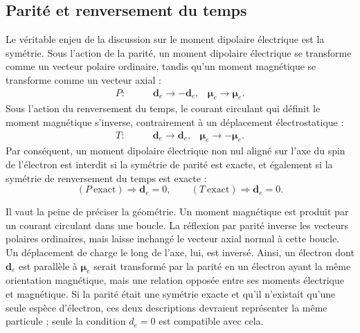 \begin{classroomqa}\end{classroomqa}

\subsection{Parité et renversement du temps}

Le véritable enjeu de la discussion sur le moment dipolaire électrique est la symétrie. Sous l’action de la parité, un moment dipolaire électrique se transforme comme un vecteur polaire ordinaire, tandis qu’un moment magnétique se transforme comme un vecteur axial : \begin{align}
P:\qquad &\mathbf d_e \to -\mathbf d_e,
&\boldsymbol{\mu}_e \to \boldsymbol{\mu}_e .
\end{align}Sous l’action du renversement du temps, le courant circulant qui définit le moment magnétique s’inverse, contrairement à un déplacement électrostatique : \begin{align}
T:\qquad &\mathbf d_e \to \mathbf d_e,
&\boldsymbol{\mu}_e \to -\boldsymbol{\mu}_e .
\end{align}Par conséquent, un moment dipolaire électrique non nul aligné sur l’axe du spin de l’électron est interdit si la symétrie de parité est exacte, et également si la symétrie de renversement du temps est exacte : \begin{equation}
(P\ \text{exact}) \Rightarrow \mathbf d_e=0,
\qquad
(T\ \text{exact}) \Rightarrow \mathbf d_e=0.
\end{equation}

Il vaut la peine de préciser la géométrie. Un moment magnétique est produit par un courant circulant dans une boucle. La réflexion par parité inverse les vecteurs polaires ordinaires, mais laisse inchangé le vecteur axial normal à cette boucle. Un déplacement de charge le long de l’axe, lui, est inversé. Ainsi, un électron dont \(\mathbf d_e\) est parallèle à \(\boldsymbol\mu_e\) serait transformé par la parité en un électron ayant la même orientation magnétique, mais une relation opposée entre ses moments électrique et magnétique. Si la parité était une symétrie exacte et qu’il n’existait qu’une seule espèce d’électron, ces deux descriptions devraient représenter la même particule ; seule la condition \(d_e=0\) est compatible avec cela.

